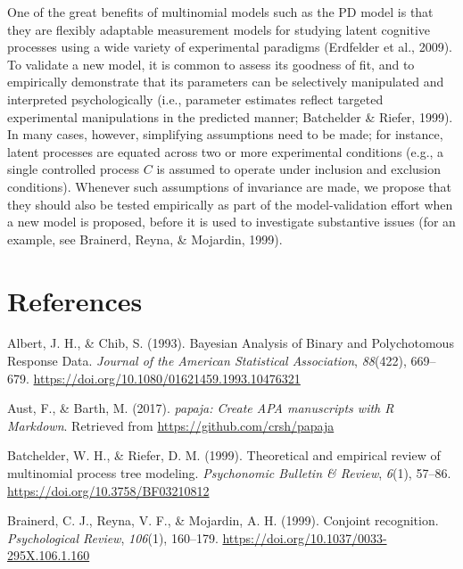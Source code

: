 \documentclass[english,,man]{apa6}
\begin{document}
One of the great benefits of multinomial models such as the PD model is that they are flexibly adaptable measurement models for studying latent cognitive processes using a wide variety of experimental paradigms (Erdfelder et al., 2009).
To validate a new model, it is common to assess its goodness of fit, and to empirically demonstrate that its parameters can be selectively manipulated and interpreted psychologically (i.e., parameter estimates reflect targeted experimental manipulations in the predicted manner; Batchelder \& Riefer, 1999).
In many cases, however, simplifying assumptions need to be made; for instance, latent processes are equated across two or more experimental conditions (e.g., a single controlled process \(C\) is assumed to operate under inclusion and exclusion conditions).
Whenever such assumptions of invariance are made, we propose that they should also be tested empirically as part of the model-validation effort when a new model is proposed, before it is used to investigate substantive issues (for an example, see Brainerd, Reyna, \& Mojardin, 1999).

\clearpage

\hypertarget{references}{%
\section{References}\label{references}}

\setlength{\parindent}{-0.5in}
\setlength{\leftskip}{0.5in}
\setlength{\parskip}{8pt}

\hypertarget{refs}{}
\leavevmode\hypertarget{ref-albert_bayesian_1993}{}%
Albert, J. H., \& Chib, S. (1993). Bayesian Analysis of Binary and Polychotomous Response Data. \emph{Journal of the American Statistical Association}, \emph{88}(422), 669--679. \url{https://doi.org/10.1080/01621459.1993.10476321}

\leavevmode\hypertarget{ref-R-papaja}{}%
Aust, F., \& Barth, M. (2017). \emph{papaja: Create APA manuscripts with R Markdown}. Retrieved from \url{https://github.com/crsh/papaja}

\leavevmode\hypertarget{ref-batchelder_theoretical_1999}{}%
Batchelder, W. H., \& Riefer, D. M. (1999). Theoretical and empirical review of multinomial process tree modeling. \emph{Psychonomic Bulletin \& Review}, \emph{6}(1), 57--86. \url{https://doi.org/10.3758/BF03210812}

\leavevmode\hypertarget{ref-brainerd_conjoint_1999}{}%
Brainerd, C. J., Reyna, V. F., \& Mojardin, A. H. (1999). Conjoint recognition. \emph{Psychological Review}, \emph{106}(1), 160--179. \url{https://doi.org/10.1037/0033-295X.106.1.160}
\end{document}
